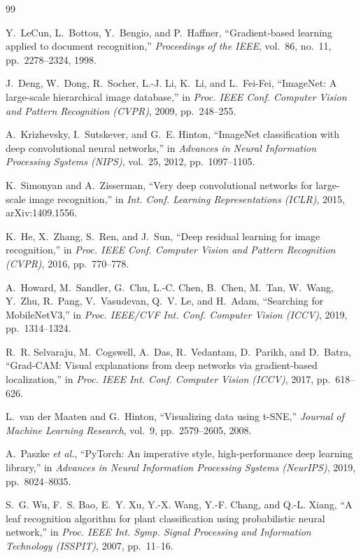 \documentclass[11pt,a4paper]{article}
\begin{document}
\begin{thebibliography}{99}

Y.~LeCun, L.~Bottou, Y.~Bengio, and P.~Haffner, ``Gradient-based learning applied to document
recognition,'' \emph{Proceedings of the IEEE}, vol.~86, no.~11, pp.~2278--2324, 1998.

J.~Deng, W.~Dong, R.~Socher, L.-J. Li, K.~Li, and L.~Fei-Fei, ``ImageNet: A large-scale hierarchical
image database,'' in \emph{Proc. IEEE Conf. Computer Vision and Pattern Recognition (CVPR)}, 2009,
pp.~248--255.

A.~Krizhevsky, I.~Sutskever, and G.~E. Hinton, ``ImageNet classification with deep convolutional
neural networks,'' in \emph{Advances in Neural Information Processing Systems (NIPS)}, vol.~25,
2012, pp.~1097--1105.

K.~Simonyan and A.~Zisserman, ``Very deep convolutional networks for large-scale image
recognition,'' in \emph{Int. Conf. Learning Representations (ICLR)}, 2015, arXiv:1409.1556.

K.~He, X.~Zhang, S.~Ren, and J.~Sun, ``Deep residual learning for image recognition,'' in
\emph{Proc. IEEE Conf. Computer Vision and Pattern Recognition (CVPR)}, 2016, pp.~770--778.

A.~Howard, M.~Sandler, G.~Chu, L.-C. Chen, B.~Chen, M.~Tan, W.~Wang, Y.~Zhu, R.~Pang, V.~Vasudevan,
Q.~V. Le, and H.~Adam, ``Searching for MobileNetV3,'' in \emph{Proc. IEEE/CVF Int. Conf. Computer
Vision (ICCV)}, 2019, pp.~1314--1324.

R.~R. Selvaraju, M.~Cogswell, A.~Das, R.~Vedantam, D.~Parikh, and D.~Batra, ``Grad-CAM: Visual
explanations from deep networks via gradient-based localization,'' in \emph{Proc. IEEE Int. Conf.
Computer Vision (ICCV)}, 2017, pp.~618--626.

L.~van der Maaten and G.~Hinton, ``Visualizing data using t-SNE,'' \emph{Journal of Machine Learning
Research}, vol.~9, pp.~2579--2605, 2008.

A.~Paszke \emph{et al.}, ``PyTorch: An imperative style, high-performance deep learning library,'' in
\emph{Advances in Neural Information Processing Systems (NeurIPS)}, 2019, pp.~8024--8035.

S.~G. Wu, F.~S. Bao, E.~Y. Xu, Y.-X. Wang, Y.-F. Chang, and Q.-L. Xiang, ``A leaf recognition
algorithm for plant classification using probabilistic neural network,'' in \emph{Proc. IEEE Int.
Symp. Signal Processing and Information Technology (ISSPIT)}, 2007, pp.~11--16.

\end{thebibliography}
\end{document}
